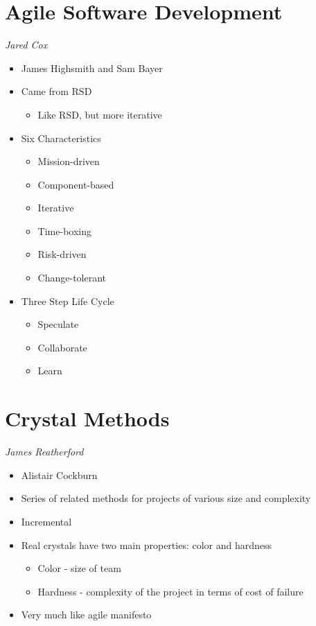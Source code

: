 \documentclass{report}
\begin{document}
		\section{Agile Software Development}
			\textit{Jared Cox}
			\begin{itemize}
				\item James Highsmith and Sam Bayer
				\item Came from RSD
					\begin{itemize}
						\item Like RSD, but more iterative
					\end{itemize}
				\item Six Characteristics
					\begin{itemize}
						\item Mission-driven
						\item Component-based
						\item Iterative
						\item Time-boxing
						\item Risk-driven
						\item Change-tolerant
					\end{itemize}
				\item Three Step Life Cycle
					\begin{itemize}
						\item Speculate
						\item Collaborate
						\item Learn
					\end{itemize}
			\end{itemize}
		\section{Crystal Methods}
			\textit{James Reatherford}
			\begin{itemize}
				\item Alistair Cockburn
				\item Series of related methods for projects of various size and complexity
				\item Incremental
				\item Real crystals have two main properties: color and hardness
				\begin{itemize}
					\item Color - size of team
					\item Hardness - complexity of the project in terms of cost of failure
				\end{itemize}
				\item Very much like agile manifesto
			\end{itemize}
\end{document}
